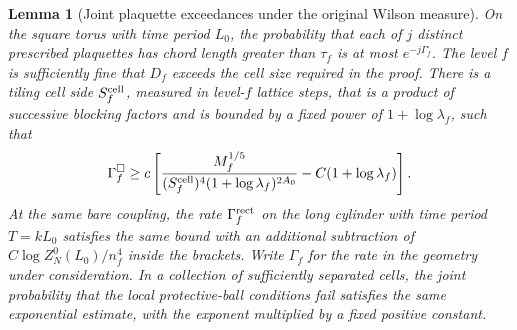 \documentclass[11pt,a4paper]{article}
\newtheorem{lemma}[theorem]{Lemma}
\numberwithin{equation}{section}
\begin{document}
\begin{lemma}[Joint plaquette exceedances under the original Wilson measure]\label{cam-bound-flags}
On the square torus with time period \(L_0\), the probability that each of \(j\) distinct prescribed plaquettes has chord length greater than \(\tau_f\) is at most \(e^{-j\Gamma_f^\square}\). The level \(f\) is sufficiently fine that \(D_f\) exceeds the cell size required in the proof. There is a tiling cell side \(S_f^{\rm cell}\), measured in level-\(f\) lattice steps, that is a product of successive blocking factors and is bounded by a fixed power of \(1+\log\lambda_f\), such that
\[
 \Gamma_f^{\square}\ge
 c\left[\frac{M_f^{1/5}}
 {(S_f^{\rm cell})^4(1+\log\lambda_f)^{2A_0}}
 -C(1+\log\lambda_f)\right].
\]
At the same bare coupling, the rate \(\Gamma_f^{\rm rect}\) on the long cylinder with time period \(T=kL_0\) satisfies the same bound with an additional subtraction of \(C\log Z_N^0(L_0)/n_f^4\) inside the brackets. Write \(\Gamma_f\) for the rate in the geometry under consideration. In a collection of sufficiently separated cells, the joint probability that the local protective-ball conditions fail satisfies the same exponential estimate, with the exponent multiplied by a fixed positive constant.
\end{lemma}
\end{document}
